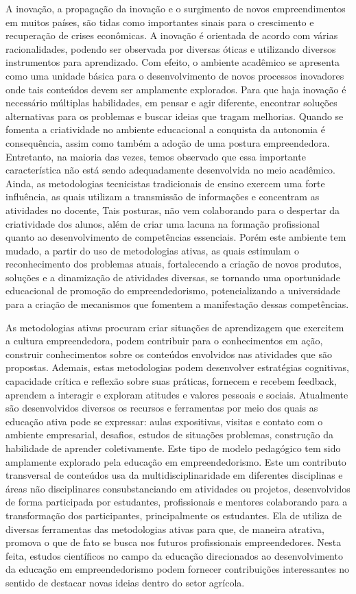 A inovação, a propagação da inovação e o surgimento de novos empreendimentos em muitos países, são tidas como importantes sinais para o crescimento e recuperação de crises econômicas. A inovação é orientada de acordo com várias racionalidades, podendo ser observada por diversas óticas e utilizando diversos instrumentos para aprendizado. Com efeito, o ambiente acadêmico se apresenta como uma unidade básica para o desenvolvimento de novos processos inovadores onde tais conteúdos devem ser amplamente explorados. Para que haja inovação é necessário múltiplas habilidades, em pensar e agir diferente, encontrar soluções alternativas para os problemas e buscar ideias que tragam melhorias. Quando se fomenta a criatividade no ambiente educacional a conquista da autonomia é consequência, assim como também a adoção de uma postura empreendedora. Entretanto, na maioria das vezes, temos observado que essa importante característica não está sendo adequadamente desenvolvida no meio acadêmico. Ainda, as metodologias tecnicistas tradicionais de ensino exercem uma forte influência, as quais utilizam a transmissão de informações e concentram as atividades no docente, Tais posturas, não vem colaborando para o despertar da criatividade dos alunos, além de criar uma lacuna na formação profissional quanto ao desenvolvimento de competências essenciais. Porém este ambiente tem mudado, a partir do uso de metodologias ativas, as quais estimulam o reconhecimento dos problemas atuais, fortalecendo a criação de novos produtos, soluções e a dinamização de atividades diversas, se tornando uma oportunidade educacional de promoção do empreendedorismo, potencializando a universidade para a criação de mecanismos que fomentem a manifestação dessas competências.


As metodologias ativas procuram criar situações de aprendizagem que exercitem a cultura empreendedora, podem contribuir para o conhecimentos em ação, construir conhecimentos sobre os conteúdos envolvidos nas atividades que são propostas. Ademais, estas metodologias podem desenvolver estratégias cognitivas, capacidade crítica e reflexão sobre suas práticas, fornecem e recebem feedback, aprendem a interagir e exploram atitudes e valores pessoais e sociais. Atualmente são desenvolvidos diversos os recursos e ferramentas por meio dos quais as educação ativa pode se expressar: aulas expositivas, visitas e contato com o ambiente empresarial, desafios, estudos de situações problemas, construção da habilidade de aprender coletivamente. Este tipo de modelo pedagógico tem sido amplamente explorado pela educação em empreendedorismo. Este um contributo transversal de conteúdos usa da multidisciplinaridade em diferentes disciplinas e áreas não disciplinares consubstanciando em atividades ou projetos, desenvolvidos de forma participada por estudantes, profissionais e mentores colaborando para a transformação dos participantes, principalmente os estudantes. Ela de utiliza de diversas ferramentas das metodologias ativas para que, de maneira atrativa, promova o que de fato se busca nos futuros profissionais empreendedores. Nesta feita, estudos científicos no campo da educação direcionados ao desenvolvimento da educação em empreendedorismo podem fornecer contribuições interessantes no sentido de destacar novas ideias dentro do setor agrícola.

